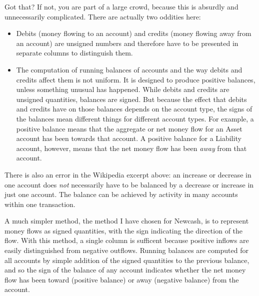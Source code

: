 \documentclass{report}
\begin{document}
Got that? If not, you are part of a large crowd, because this is absurdly and unnecessarily  complicated. There are actually two oddities here:
\begin{itemize} 
\item Debits (money flowing to an account) and credits (money flowing away from an account) are unsigned numbers and therefore have to be presented in separate columns to distinguish them. 

\item The computation of running balances of accounts and the way debits and credits affect them is not uniform. It is designed to produce positive balances, unless something unusual has happened. While debits and credits are unsigned quantities, balances are signed. But because the effect that debits and credits have on those balances depends on the account type, the signs of the balances mean different things for different account types. For example, a positive balance means that the aggregate or net money flow for an Asset account has been towards that account. A positive balance for a Liability account, however, means that the net money flow has been \emph{away} from that account.
\end{itemize}

There is also an error in the Wikipedia excerpt above: an increase or decrease in one account does \emph{not} necessarily have to be balanced by a decrease or increase in just one account. The balance can be achieved by activity in many accounts within one transaction.

A much simpler method, the method I have chosen for Newcash, is to represent money flows as signed quantities, with the sign indicating the direction of the flow. With this method, a single column is sufficent because positive inflows are easily distinguished from negative outflows. Running balances are computed for all accounts by simple addition of the signed quantities to the previous balance, and so the sign of the balance of any account indicates whether the net money flow has been toward (positive balance) or away (negative balance) from the account. 
\end{document}
